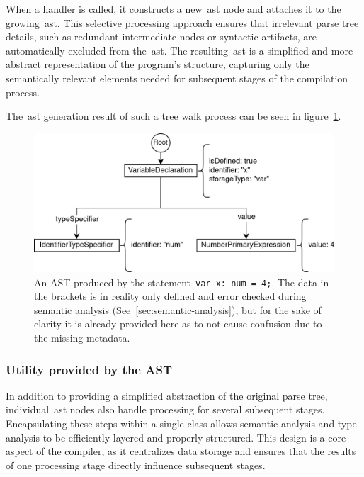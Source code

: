 When a handler is called, it constructs a new~\acrshort{ast} node and attaches it to the growing~\acrshort{ast}. This selective processing approach ensures that irrelevant parse tree details, such as redundant intermediate nodes or syntactic artifacts, are automatically excluded from the~\acrshort{ast}. The resulting~\acrshort{ast} is a simplified and more abstract representation of the program's structure, capturing only the semantically relevant elements needed for subsequent stages of the compilation process.

The~\acrshort{ast} generation result of such a tree walk process can be seen in figure~\ref{fig:implementation:ast}.

\begin{figure}[h!]
	\centering
	\includegraphics[scale=1]{./pics/AST.drawio}
	\caption{An AST produced by the statement~\lstinline|var x: num = 4;|. The data in the brackets is in reality only defined and error checked during semantic analysis (See~\ref{sec:semantic-analysis}), but for the sake of clarity it is already provided here as to not cause confusion due to the missing metadata.}
	\label{fig:implementation:ast}
\end{figure}

\subsubsection{Utility provided by the AST}

In addition to providing a simplified abstraction of the original parse tree, individual~\acrshort{ast} nodes also handle processing for several subsequent stages. Encapsulating these steps within a single class allows semantic analysis and type analysis to be efficiently layered and properly structured. This design is a core aspect of the compiler, as it centralizes data storage and ensures that the results of one processing stage directly influence subsequent stages.

